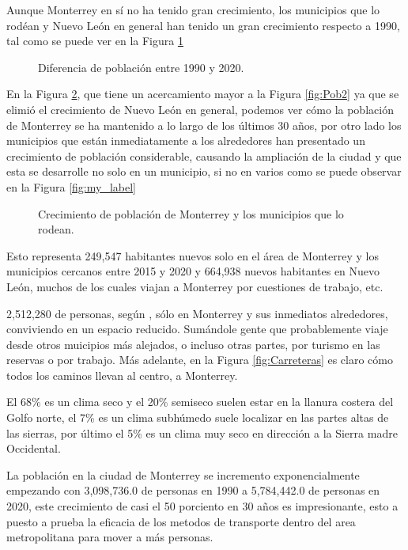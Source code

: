 \documentclass[a4paper]{article}
\begin{document}
Aunque Monterrey en sí no ha tenido gran crecimiento, los municipios que lo rodéan y Nuevo León en general han tenido un gran crecimiento respecto a 1990, tal como se puede ver en la Figura \ref{fig:Pob1}

\begin{figure}[H]
    \centering

    \caption{Diferencia de población entre 1990 y 2020.\autocite{Poblacion}}
    \label{fig:Pob1}
\end{figure}

En la Figura \ref{fig:Pob3}, que tiene un acercamiento mayor a la Figura \ref{fig:Pob2} ya que se elimió el crecimiento de Nuevo León en general,  podemos ver cómo la población de Monterrey se ha mantenido a lo largo de los últimos 30 años, por otro lado los municipios que están inmediatamente a los alrededores han presentado un crecimiento de población considerable, causando la ampliación de la ciudad y que esta se desarrolle no solo en un municipio, si no en varios como se puede observar en la Figura  \ref{fig:my_label}


\begin{figure}[H]
    \centering

    \caption{Crecimiento de población de Monterrey y los municipios que lo rodean.\autocite{Poblacion}}
    \label{fig:Pob3}
\end{figure}


Esto representa 249,547 habitantes nuevos solo en el área de Monterrey y los municipios cercanos entre 2015 y 2020 y 664,938 nuevos habitantes en Nuevo León, muchos de los cuales viajan a Monterrey por cuestiones de trabajo, etc.

2,512,280 de personas, según \autocite{Poblacion},  sólo en Monterrey y sus inmediatos alrededores, conviviendo en un espacio reducido. Sumándole gente que probablemente viaje desde otros muicipios más alejados, o incluso otras partes, por turismo en las reservas o por trabajo. Más adelante, en la Figura \ref{fig:Carreteras} es claro cómo todos los caminos llevan al centro, a Monterrey.

\autocite{RN5}

 El 68\% es un clima seco y el 20\% semiseco suelen estar en la llanura costera del Golfo norte, el 7\% es un clima subhúmedo suele localizar en las partes altas de las sierras, por último el 5\% es un clima muy seco en dirección a la Sierra madre Occidental.

\autocite{RN6}

La población en la ciudad de Monterrey se incremento exponencialmente empezando con 3,098,736.0 de personas en 1990 a 5,784,442.0 de personas en 2020, este crecimiento de casi el 50 porciento en 30 años es impresionante, esto a puesto a prueba la eficacia de los metodos de transporte dentro del area metropolitana para mover a más personas.
\end{document}
